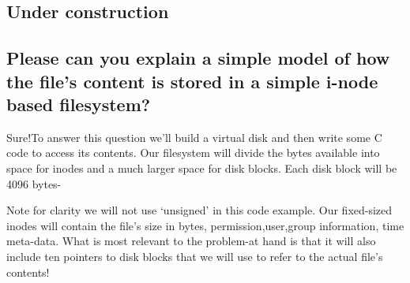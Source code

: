 \subsection{Under construction}\label{under-construction}

\subsection{Please can you explain a simple model of how the file's
content is stored in a simple i-node based
filesystem?}\label{please-can-you-explain-a-simple-model-of-how-the-files-content-is-stored-in-a-simple-i-node-based-filesystem}

Sure!To answer this question we'll build a virtual disk and then write
some C code to access its contents. Our filesystem will divide the bytes
available into space for inodes and a much larger space for disk blocks.
Each disk block will be 4096 bytes-

\begin{Shaded}
\begin{Highlighting}[]

 \NormalTok{[}\NormalTok{] block_t;}

 
\end{Highlighting}
\end{Shaded}

Note for clarity we will not use `unsigned' in this code example. Our
fixed-sized inodes will contain the file's size in bytes,
permission,user,group information, time meta-data. What is most relevant
to the problem-at hand is that it will also include ten pointers to disk
blocks that we will use to refer to the actual file's contents!

\begin{Shaded}
\begin{Highlighting}[]
 
 \NormalTok{[}\NormalTok{] directblocks; }
  
  
\NormalTok{\}}
\end{Highlighting}
\end{Shaded}

